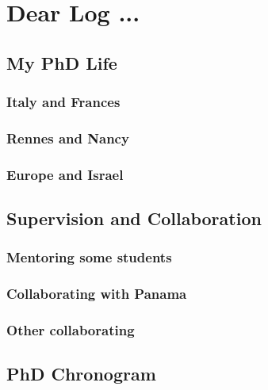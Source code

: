 \chapter{Dear Log ...}

\section{My PhD Life}

\subsection{Italy and Frances}
\subsection{Rennes and Nancy}
\subsection{Europe and Israel}

\section{Supervision and Collaboration}

\subsection{Mentoring some students}
\subsection{Collaborating with Panama}
\subsection{Other collaborating}

\section{PhD Chronogram}